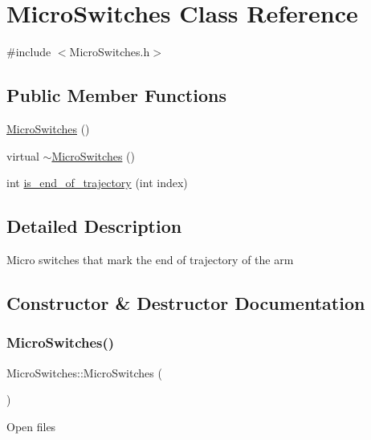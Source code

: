 \hypertarget{classMicroSwitches}{}\section{Micro\+Switches Class Reference}
\label{classMicroSwitches}


{\ttfamily \#include $<$Micro\+Switches.\+h$>$}

\subsection*{Public Member Functions}
\begin{DoxyCompactItemize}
\item 
\mbox{\hyperlink{classMicroSwitches_a4073b2b20626c10b5ed143ddcf2be96e}{Micro\+Switches}} ()
\item 
virtual \mbox{\hyperlink{classMicroSwitches_a36b91bb2ff18836d0a669929fbe34cbf}{$\sim$\+Micro\+Switches}} ()
\item 
int \mbox{\hyperlink{classMicroSwitches_acff92bf7c9c16cc9c8e255dbf8ca5aaf}{is\+\_\+end\+\_\+of\+\_\+trajectory}} (int index)
\end{DoxyCompactItemize}


\subsection{Detailed Description}
Micro switches that mark the end of trajectory of the arm 

\subsection{Constructor \& Destructor Documentation}
\mbox{\label{classMicroSwitches_a4073b2b20626c10b5ed143ddcf2be96e}} 
\subsubsection{\texorpdfstring{Micro\+Switches()}{MicroSwitches()}}
{\footnotesize\ttfamily Micro\+Switches\+::\+Micro\+Switches (\begin{DoxyParamCaption}{ }\end{DoxyParamCaption})}

Open files \mbox{\label{classMicroSwitches_a36b91bb2ff18836d0a669929fbe34cbf}} 
